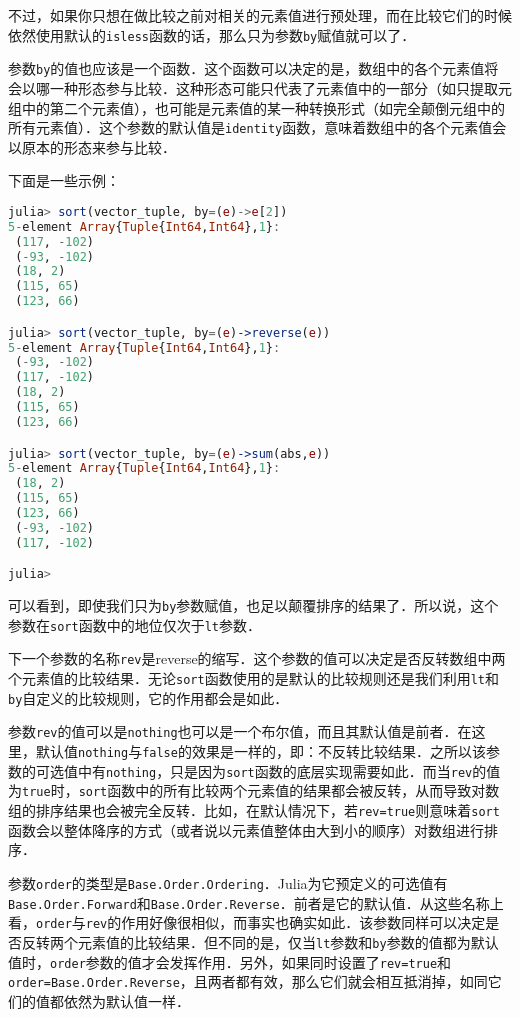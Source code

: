 不过，如果你只想在做比较之前对相关的元素值进行预处理，而在比较它们的时候依然使用默认的\verb|isless|函数的话，那么只为参数\verb|by|赋值就可以了．

参数\verb|by|的值也应该是一个函数．这个函数可以决定的是，数组中的各个元素值将会以哪一种形态参与比较．这种形态可能只代表了元素值中的一部分（如只提取元组中的第二个元素值），也可能是元素值的某一种转换形式（如完全颠倒元组中的所有元素值）．这个参数的默认值是\verb|identity|函数，意味着数组中的各个元素值会以原本的形态来参与比较．

下面是一些示例：

\begin{lstlisting}[language=julia]
julia> sort(vector_tuple, by=(e)->e[2])
5-element Array{Tuple{Int64,Int64},1}:
 (117, -102)
 (-93, -102)
 (18, 2)    
 (115, 65)  
 (123, 66)  

julia> sort(vector_tuple, by=(e)->reverse(e))
5-element Array{Tuple{Int64,Int64},1}:
 (-93, -102)
 (117, -102)
 (18, 2)    
 (115, 65)  
 (123, 66)  

julia> sort(vector_tuple, by=(e)->sum(abs,e))
5-element Array{Tuple{Int64,Int64},1}:
 (18, 2)    
 (115, 65)  
 (123, 66)  
 (-93, -102)
 (117, -102)

julia> 
\end{lstlisting}

可以看到，即使我们只为\verb|by|参数赋值，也足以颠覆排序的结果了．所以说，这个参数在\verb|sort|函数中的地位仅次于\verb|lt|参数．

下一个参数的名称\verb|rev|是reverse的缩写．这个参数的值可以决定是否反转数组中两个元素值的比较结果．无论\verb|sort|函数使用的是默认的比较规则还是我们利用\verb|lt|和\verb|by|自定义的比较规则，它的作用都会是如此．

参数\verb|rev|的值可以是\verb|nothing|也可以是一个布尔值，而且其默认值是前者．在这里，默认值\verb|nothing|与\verb|false|的效果是一样的，即：不反转比较结果．之所以该参数的可选值中有\verb|nothing|，只是因为\verb|sort|函数的底层实现需要如此．而当\verb|rev|的值为\verb|true|时，\verb|sort|函数中的所有比较两个元素值的结果都会被反转，从而导致对数组的排序结果也会被完全反转．比如，在默认情况下，若\verb|rev=true|则意味着\verb|sort|函数会以整体降序的方式（或者说以元素值整体由大到小的顺序）对数组进行排序．

参数\verb|order|的类型是\verb|Base.Order.Ordering|．Julia为它预定义的可选值有\verb|Base.Order.Forward|和\verb|Base.Order.Reverse|．前者是它的默认值．从这些名称上看，\verb|order|与\verb|rev|的作用好像很相似，而事实也确实如此．该参数同样可以决定是否反转两个元素值的比较结果．但不同的是，仅当\verb|lt|参数和\verb|by|参数的值都为默认值时，\verb|order|参数的值才会发挥作用．另外，如果同时设置了\verb|rev=true|和\verb|order=Base.Order.Reverse|，且两者都有效，那么它们就会相互抵消掉，如同它们的值都依然为默认值一样．

